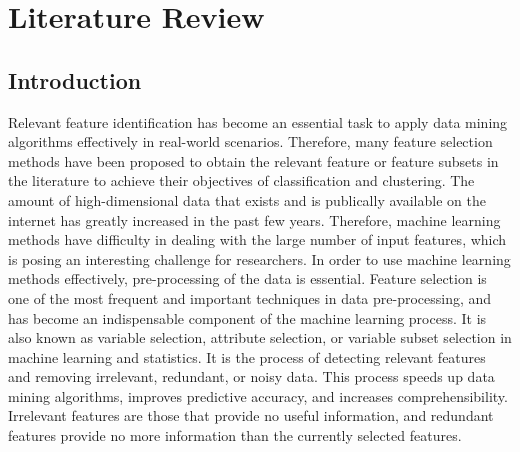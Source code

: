 \documentclass[document.tex]{subfiles}
\begin{document}
\chapter{Literature Review}

\section{Introduction}
\noindent Relevant feature identification has become an essential task to apply data mining algorithms effectively in real-world scenarios. Therefore, many feature selection methods have been proposed to obtain the relevant feature or feature subsets in the literature to achieve their objectives of classification and clustering.
The amount of high-dimensional data that exists and is publically available on the internet has greatly increased in the past few years. Therefore, machine learning methods have difficulty in dealing with the large number of input features, which is posing an interesting challenge for researchers. In order to use machine learning methods effectively, pre-processing of the data is essential. Feature selection is one of the most frequent and important techniques in data pre-processing\cite{2}, and has become an indispensable component of the machine learning process. It is also known as variable selection, attribute selection, or variable subset selection in machine learning and statistics. It is the process of detecting relevant features and removing irrelevant, redundant, or noisy data. This process speeds up data mining algorithms, improves predictive accuracy, and increases
comprehensibility. Irrelevant features are those that provide no useful information, and
redundant features provide no more information than the currently selected features.
\end{document}
